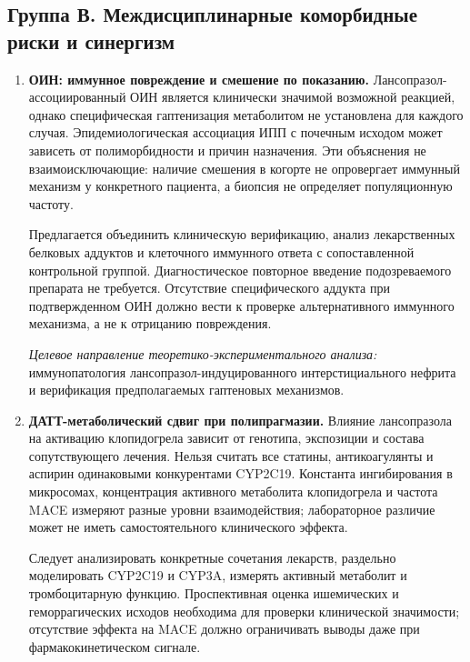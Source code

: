 \documentclass[11pt,a4paper,notitlepage]{report}
\newcommand{\src}[1]{\unskip\space\cite{#1}}
\begin{document}
\subsection{Группа В. Междисциплинарные коморбидные риски и синергизм}
\begin{enumerate}[label=\textbf{\arabic*.},start=12,leftmargin=*,itemsep=0.9\baselineskip]

\item {\raggedright \textbf{ОИН: иммунное повреждение и смешение по показанию.} Лансопразол-ассоциированный ОИН является клинически значимой возможной реакцией, однако специфическая гаптенизация метаболитом не установлена для каждого случая. Эпидемиологическая ассоциация ИПП с почечным исходом может зависеть от полиморбидности и причин назначения. Эти объяснения не взаимоисключающие: наличие смешения в когорте не опровергает иммунный механизм у конкретного пациента, а биопсия не определяет популяционную частоту.\src{safeain,renalblank2014,renalbigan2025}\par}

Предлагается объединить клиническую верификацию, анализ лекарственных белковых аддуктов и клеточного иммунного ответа с сопоставленной контрольной группой. Диагностическое повторное введение подозреваемого препарата не требуется. Отсутствие специфического аддукта при подтвержденном ОИН должно вести к проверке альтернативного иммунного механизма, а не к отрицанию повреждения.

{\raggedright \textit{Целевое направление теоретико-экспериментального анализа:} иммунопатология лансопразол-индуцированного интерстициального нефрита и верификация предполагаемых гаптеновых механизмов.\par}

\item \textbf{ДАТТ-метаболический сдвиг при полипрагмазии.} Влияние лансопразола на активацию клопидогрела зависит от генотипа, экспозиции и состава сопутствующего лечения. Нельзя считать все статины, антикоагулянты и аспирин одинаковыми конкурентами CYP2C19. Константа ингибирования в микросомах, концентрация активного метаболита клопидогрела и частота MACE измеряют разные уровни взаимодействия; лабораторное различие может не иметь самостоятельного клинического эффекта.\src{cardioli2004,cardioogilvie2011,cardiofrelinger2012,cardiocpic2022}

Следует анализировать конкретные сочетания лекарств, раздельно моделировать CYP2C19 и CYP3A, измерять активный метаболит и тромбоцитарную функцию. Проспективная оценка ишемических и геморрагических исходов необходима для проверки клинической значимости; отсутствие эффекта на MACE должно ограничивать выводы даже при фармакокинетическом сигнале.


\end{enumerate}
\end{document}
